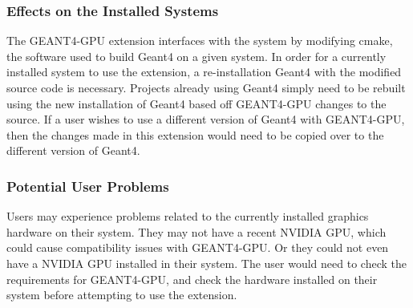 \documentclass[12pt]{article}
\newcommand{\todo}[1]{\textcolor{red}{[TODO: #1]}} \else
\newcommand{\authornote}[3]{} \newcommand{\todo}[1]{} \fi
\newcommand{\ds}[1]{\authornote{blue}{DS}{#1}} %
\newcommand{\vr}[1]{\authornote{green}{VR}{#1}}
\begin{document}
\subsubsection{Effects on the Installed Systems}
The GEANT4-GPU extension interfaces with the system by modifying cmake, the software used to build Geant4 on a given system. In order for a currently installed system to use the extension, a re-installation Geant4 with the modified source code is necessary. Projects already using Geant4 simply need to be rebuilt using the new installation of Geant4 based off GEANT4-GPU changes to the source. If a user wishes to use a different version of Geant4 with GEANT4-GPU, then the changes made in this extension would need to be copied over to the different version of Geant4.
\ds{Again you are talking about design. Here you should be detailing what your
how your product interfaces with the existing system. Are there any potential
conflicts that would need to be solved (i.e. by your design decision)?}

\subsubsection{Potential User Problems}
Users may experience problems related to the currently installed graphics hardware on their system. They may not have a recent NVIDIA GPU, which could cause compatibility issues with GEANT4-GPU. Or they could not even have a NVIDIA GPU installed in their system. The user would need to check the requirements for GEANT4-GPU, and check the hardware installed on their system before attempting to use the extension.
\ds{You are again making design decisions instead of detailing potential problems
to be solved by those decisions}
\vr{Detailed potential problem for users when attempting to use the GEANT4-GPU extension}
\end{document}
